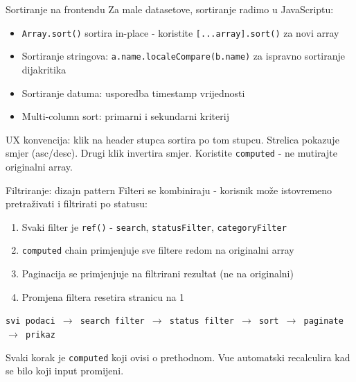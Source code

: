 \begin{frame}{Sortiranje na frontendu}
Za male datasetove, sortiranje radimo u JavaScriptu:

\vspace{0.4em}
\begin{itemize}
  \item \texttt{Array.sort()} sortira in-place - koristite \texttt{[...array].sort()} za novi array
  \item Sortiranje stringova: \texttt{a.name.localeCompare(b.name)} za ispravno sortiranje dijakritika
  \item Sortiranje datuma: usporedba timestamp vrijednosti
  \item Multi-column sort: primarni i sekundarni kriterij
\end{itemize}

\vspace{0.6em}
UX konvencija: klik na header stupca sortira po tom stupcu. Strelica pokazuje smjer (asc/desc). Drugi klik invertira smjer. Koristite \texttt{computed} - ne mutirajte originalni array.
\end{frame}

\begin{frame}{Filtriranje: dizajn pattern}
Filteri se kombiniraju - korisnik može istovremeno pretraživati i filtrirati po statusu:

\vspace{0.4em}
\begin{enumerate}
  \item Svaki filter je \texttt{ref()} - \texttt{search}, \texttt{statusFilter}, \texttt{categoryFilter}
  \item \texttt{computed} chain primjenjuje sve filtere redom na originalni array
  \item Paginacija se primjenjuje na filtrirani rezultat (ne na originalni)
  \item Promjena filtera resetira stranicu na 1
\end{enumerate}

\vspace{0.6em}
\begin{center}
\texttt{svi podaci $\rightarrow$ search filter $\rightarrow$ status filter $\rightarrow$ sort $\rightarrow$ paginate $\rightarrow$ prikaz}
\end{center}

\vspace{0.4em}
Svaki korak je \texttt{computed} koji ovisi o prethodnom. Vue automatski recalculira kad se bilo koji input promijeni.
\end{frame}

